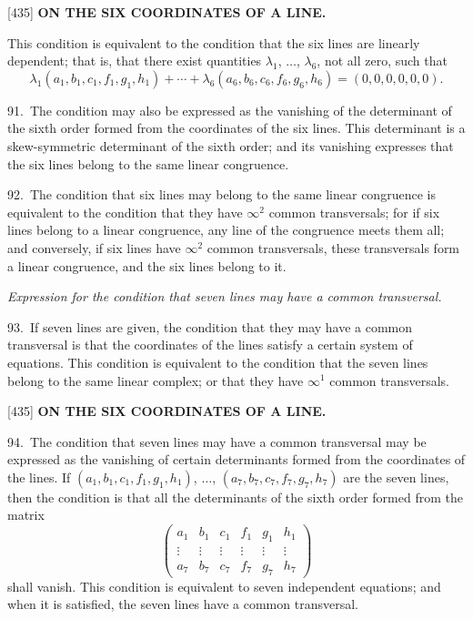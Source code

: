 \documentclass[12pt,a4paper]{article}
\newcommand{\paperref}[1]{\textup{[#1]}}
\theoremstyle{definition}
\begin{document}
\newpage
\setcounter{page}{98}

\noindent\paperref{435}\quad
\textbf{ON THE SIX COORDINATES OF A LINE.}

This condition is equivalent to the condition that the six lines are linearly dependent; that is, that there exist quantities $\lambda_1$, $\ldots$, $\lambda_6$, not all zero, such that
\[
\lambda_1 (a_1, b_1, c_1, f_1, g_1, h_1) + \cdots + \lambda_6 (a_6, b_6, c_6, f_6, g_6, h_6) = (0, 0, 0, 0, 0, 0).
\]

91.~The condition may also be expressed as the vanishing of the determinant of the sixth order formed from the coordinates of the six lines. This determinant is a skew-symmetric determinant of the sixth order; and its vanishing expresses that the six lines belong to the same linear congruence.

92.~The condition that six lines may belong to the same linear congruence is equivalent to the condition that they have $\infty^2$ common transversals; for if six lines belong to a linear congruence, any line of the congruence meets them all; and conversely, if six lines have $\infty^2$ common transversals, these transversals form a linear congruence, and the six lines belong to it.

\textit{Expression for the condition that seven lines may have a common transversal.}

93.~If seven lines are given, the condition that they may have a common transversal is that the coordinates of the lines satisfy a certain system of equations. This condition is equivalent to the condition that the seven lines belong to the same linear complex; or that they have $\infty^1$ common transversals.

\newpage
\setcounter{page}{99}

\noindent\paperref{435}\quad
\textbf{ON THE SIX COORDINATES OF A LINE.}

94.~The condition that seven lines may have a common transversal may be expressed as the vanishing of certain determinants formed from the coordinates of the lines. If $(a_1, b_1, c_1, f_1, g_1, h_1)$, $\ldots$, $(a_7, b_7, c_7, f_7, g_7, h_7)$ are the seven lines, then the condition is that all the determinants of the sixth order formed from the matrix
\[
\begin{pmatrix}
a_1 & b_1 & c_1 & f_1 & g_1 & h_1 \\
\vdots & \vdots & \vdots & \vdots & \vdots & \vdots \\
a_7 & b_7 & c_7 & f_7 & g_7 & h_7
\end{pmatrix}
\]
shall vanish. This condition is equivalent to seven independent equations; and when it is satisfied, the seven lines have a common transversal.
\end{document}
